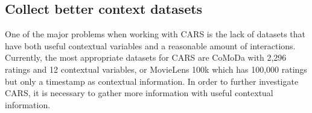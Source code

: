 \subsection{Collect better context datasets}
One of the major problems when working with CARS is the lack of datasets that have both useful contextual variables and a reasonable amount of interactions.
Currently, the most appropriate datasets for CARS are CoMoDa with 2,296 ratings and 12 contextual variables, or MovieLens 100k which has 100,000 ratings but only a timestamp as contextual information.
In order to further investigate CARS, it is necessary to gather more information with useful contextual information.
